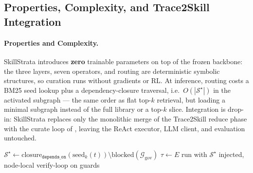 \subsection{Properties, Complexity, and Trace2Skill Integration}
\label{sec:m4}

\paragraph{Properties and Complexity.}
SkillStrata introduces \textbf{zero} trainable parameters on top of the frozen backbone: the three layers, seven operators, and routing are deterministic symbolic structures, so curation runs without gradients or RL.
At inference, routing costs a BM25 seed lookup plus a dependency-closure traversal, i.e.\ $O(|\mathcal{S}^\star|)$ in the activated subgraph --- the same order as flat top-$k$ retrieval, but loading a minimal subgraph instead of the full library or a top-$k$ slice.
Integration is drop-in: SkillStrata replaces only the monolithic merge of the Trace2Skill reduce phase with the curate loop of , %
leaving the ReAct executor, LLM client, and evaluation untouched.

\begin{algorithm}[t]
\caption{SkillStrata: Curate (offline) and Route (inference)}
\label{alg:ops}
$\mathcal{S}^\star \leftarrow \text{closure}_{\texttt{depends\_on}}(\text{seed}_k(t))\setminus\text{blocked}(\mathcal{G}_{\text{gov}})$
$\tau \leftarrow E$ run with $\mathcal{S}^\star$ injected, node-local verify-loop on guards
\end{algorithm}

